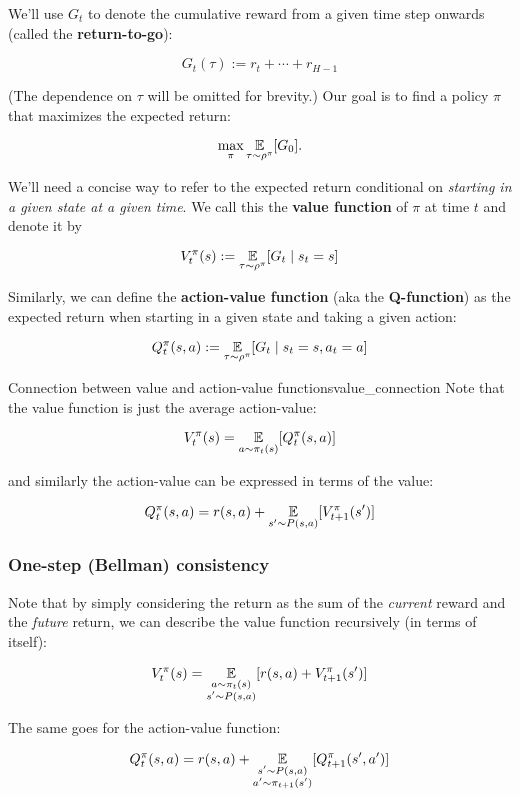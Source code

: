 \documentclass[../main/main]{subfiles}
\begin{document}
We'll use $G_t$ to denote the cumulative reward from a given time step onwards (called the \textbf{return-to-go}):

\[
    G_t(\tau) := r_t + \cdots + r_{H-1}
\]

(The dependence on $\tau$ will be omitted for brevity.) Our goal is to find a policy $\pi$ that maximizes the expected return:

\[
    \max_{\pi} \operatorname*{\mathbb{E}}_{\tau \sim \rho^\pi} [G_0].
\]

We'll need a concise way to refer to the expected return conditional on \emph{starting in a given state at a given time}. We call this the \textbf{value function} of $\pi$ at time $t$ and denote it by

\[
    V_t^\pi(s) := \operatorname*{\mathbb{E}}_{\tau \sim \rho^\pi} [G_t \mid s_t = s]
\]


Similarly, we can define the \textbf{action-value function} (aka the \textbf{Q-function}) as the expected return when starting in a given state and taking a given action:

\[
    Q_t^\pi(s, a) := \operatorname*{\mathbb{E}}_{\tau \sim \rho^\pi} [G_t \mid s_t = s, a_t = a]
\]

\begin{remark}{Connection between value and action-value functions}{value_connection}
    Note that the value function is just the average action-value:

    \[
        V_t^\pi(s) = \operatorname*{\mathbb{E}}_{a \sim \pi_t(s)} [Q_t^\pi(s, a)]
    \]

    and similarly the action-value can be expressed in terms of the value:

    \[
        Q_t^\pi(s, a) = r(s, a) + \operatorname*{\mathbb{E}}_{s' \sim P(s, a)} [V_{t+1}^\pi(s')]
    \]
\end{remark}

\subsubsection{One-step (Bellman) consistency}

Note that by simply considering the return as the sum of the \emph{current} reward and the \emph{future} return, we can describe the value function recursively (in terms of itself):

\[
    V_t^\pi(s) = \operatorname*{\mathbb{E}}_{\substack{a \sim \pi_t(s) \\ s' \sim P(s, a)}} [r(s, a) + V_{t+1}^\pi(s')]
\]

The same goes for the action-value function:

\[
    Q_t^\pi(s, a) = r(s, a) + \operatorname*{\mathbb{E}}_{\substack{s' \sim P(s, a) \\ a' \sim \pi_{t+1}(s')}} [Q_{t+1}^\pi(s', a')]
\]
\end{document}
